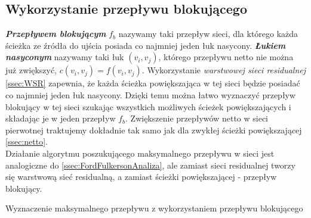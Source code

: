 \subsection{Wykorzystanie przepływu blokującego}\label{ssec:blockingFlowAnaliza}
\textbf{\textit{Przepływem blokującym}} $ f_b $ nazywamy taki przepływ sieci, dla którego każda ścieżka ze źródła do ujścia posiada co najmniej jeden łuk nasycony. \textbf{\textit{Łukiem nasyconym}} nazywamy taki łuk $ (v_i,v_j) $, którego przepływu netto nie można już zwiększyć, $ c(v_i,v_j)=f(v_i,v_j) $. Wykorzystanie \textit{warstwowej sieci residualnej} \ref{ssec:WSR} zapewnia, że każda ścieżka powiększająca w tej sieci będzie posiadać co najmniej jeden łuk nasycony. Dzięki temu można łatwo wyznaczyć przepływ blokujący w tej sieci szukając wszystkich możliwych ścieżek powiększających i składając je w jeden przepływ $ f_b $. Zwiększenie przepływów netto w sieci pierwotnej traktujemy dokładnie tak samo jak dla zwykłej ścieżki powiększającej \ref{ssec:netto}.\\\indent
Działanie algorytmu poszukującego maksymalnego przepływu w sieci jest analogiczne do  \ref{ssec:FordFulkersonAnaliza}, ale zamiast sieci residualnej tworzy się warstwową sieć residualną, a zamiast ścieżki powiększającej - przepływ blokujący.
\begin{algorithm}[H]
	\caption{Wyznaczenie maksymalnego przepływu z wykorzystaniem przepływu blokującego} \label{blockingFlowPseudo}
	\begin{algorithmic}
		\EndWhile\space
		\EndProcedure
	\end{algorithmic}
\end{algorithm}

